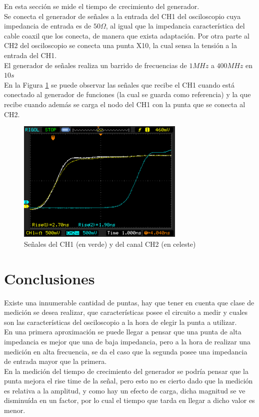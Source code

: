 \documentclass[a4paper,10pt]{article}
\begin{document}
		\indent En esta secci\'on se mide el tiempo de crecimiento del 
		generador. \\
 		\indent Se conecta el generador de se\~nales a la entrada del CH1 del
		osciloscopio cuya impedancia de entrada es de $50 \Omega$, al igual 
		que la impedancia caracter\'istica del cable coaxil que los conecta, 
		de manera que exista adaptaci\'on. Por otra parte al CH2 del 
		osciloscopio se conecta una punta X10, la cual sensa la tensi\'on a la
		entrada del CH1. \\
		\indent El generador de se\~nales realiza un barrido de frecuencias de
		$1MHz$ a $400MHz$ en $10s$ \\
		\indent En la Figura \ref{img008} se puede observar las se\~nales que
		recibe el CH1 cuando est\'a conectado al generador de funciones (la 
		cual se guarda como referencia) y la que recibe cuando adem\'as se 
		carga el nodo del CH1 con la punta que se conecta al CH2.
		
		
		\begin{figure}[!htb]
			\centering
			\includegraphics[width=8cm]
			{Imagenes/Mediciones instrumentos/NewFile10.png}
			\caption{Se\~nales del CH1 (en verde) y del canal CH2 (en celeste)
			} \label{img008}
		\end{figure}
	\newpage
	\section{Conclusiones}
	\indent Existe una innumerable cantidad de puntas, hay que tener en cuenta
	que clase de medición se desea realizar, que características posee el 
	circuito a medir y cuales son las características del osciloscopio a la 
	hora de elegir la punta a utilizar. \\
	\indent En una primera aproximación se puede llegar a pensar que una punta
	de alta impedancia es mejor que una de baja impedancia, pero a la hora de
	realizar una medición en alta frecuencia, se da el caso que la segunda 
	posee una impedancia de entrada mayor que la primera.\\
	\indent En la medición del tiempo de crecimiento del generador se podría
	pensar que la punta mejora el rise time de la señal, pero esto no es
	cierto dado que la medición es relativa a la amplitud, y como hay un 
	efecto de carga, dicha magnitud se ve disminuída en un factor, por lo cual
	el tiempo que tarda en llegar a	dicho valor es menor.
\end{document}
